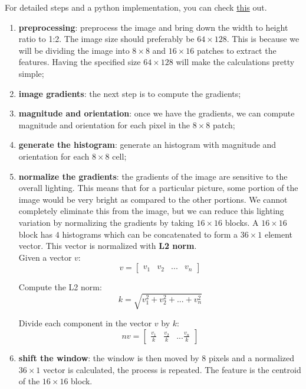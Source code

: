 \documentclass{article}
\begin{document}
For detailed steps and a python implementation, you can check \href{https://www.analyticsvidhya.com/blog/2019/09/feature-engineering-images-introduction-hog-feature-descriptor/}{this} out.
\begin{enumerate}[start=0]
    \item \textbf{preprocessing}: preprocess the image and bring down the width to height ratio to 1:2. The image size should preferably be $64\times 128$. This is because we will be dividing the image into $8\times8$ and $16\times16$ patches to extract the features. Having the specified size $64\times 128$ will make the calculations pretty simple;
    \item \textbf{image gradients}: the next step is to compute the gradients;
    \item \textbf{magnitude and orientation}: once we have the gradients, we can compute magnitude and orientation for each pixel in the $8\times 8$ patch;
    \item \textbf{generate the histogram}: generate an histogram with magnitude and orientation for each $8\times 8$ cell;
    \item \textbf{normalize the gradients}: the gradients of the image are sensitive to the overall lighting. This means that for a particular picture, some portion of the image would be very bright as compared to the other portions. We cannot completely eliminate this from the image, but we can reduce this lighting variation by normalizing the gradients by taking $16\times 16$ blocks. A $16\times 16$ block has $4$ histograms which can be concatenated to form a $36\times 1$ element vector. This vector is normalized with \textbf{L2 norm}. \\

    Given a vector $v$:
    \begin{equation*}
        v = \begin{bmatrix}
            v_1 & v_2 & ... & v_n
        \end{bmatrix}
    \end{equation*}

    Compute the L2 norm:
    \begin{equation*}
        k = \sqrt{v_1^2 + v_2^2 + ... + v_n^2}
    \end{equation*}

    Divide each component in the vector $v$ by $k$:
    \begin{equation*}
        nv = \begin{bmatrix}
            \frac{v_1}{k} & \frac{v_2}{k} & ... \frac{v_n}{k} 
        \end{bmatrix}
    \end{equation*}

    \item \textbf{shift the window}: the window is then moved by $8$ pixels and a normalized $36\times 1$ vector is calculated, the process is repeated. The feature is the centroid of the $16\times 16$ block.

\end{enumerate}
\end{document}
